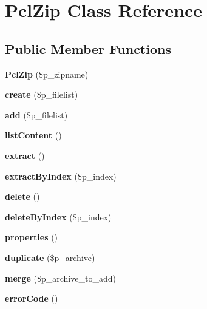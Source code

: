 \section{Pcl\+Zip Class Reference}
\label{class_pcl_zip}
\subsection*{Public Member Functions}
\begin{DoxyCompactItemize}
\item 
{\bfseries Pcl\+Zip} (\$p\+\_\+zipname)\label{class_pcl_zip_a9b976cdbf0d749a94a34032e1fe499ba}

\item 
{\bfseries create} (\$p\+\_\+filelist)\label{class_pcl_zip_a2d670a34def1c5d97c3f69eb82731d5e}

\item 
{\bfseries add} (\$p\+\_\+filelist)\label{class_pcl_zip_a5cfbc5c6c546df2441fac5f84b98b7d1}

\item 
{\bfseries list\+Content} ()\label{class_pcl_zip_aa62e6edce822f22d87e8e40c4f5c5f56}

\item 
{\bfseries extract} ()\label{class_pcl_zip_a017ef4fbe3e4fedcdffd97fed288016f}

\item 
{\bfseries extract\+By\+Index} (\$p\+\_\+index)\label{class_pcl_zip_aaf15292d046413ff20768f5cad5f301d}

\item 
{\bfseries delete} ()\label{class_pcl_zip_a13bdffdd926f26b825ea57066334ff01}

\item 
{\bfseries delete\+By\+Index} (\$p\+\_\+index)\label{class_pcl_zip_a0e22a395713b0dc6e452308532246df8}

\item 
{\bfseries properties} ()\label{class_pcl_zip_aaa661befbd8fbf46d5fc8e5b3536a453}

\item 
{\bfseries duplicate} (\$p\+\_\+archive)\label{class_pcl_zip_a6f87fbff9055133d10e689825a0a700d}

\item 
{\bfseries merge} (\$p\+\_\+archive\+\_\+to\+\_\+add)\label{class_pcl_zip_a55ee35dbad34a1e309ea16deb44fc195}

\item 
{\bfseries error\+Code} ()\label{class_pcl_zip_a928a98b280c4dd8971ce6998eb157409}


\end{DoxyCompactItemize}
